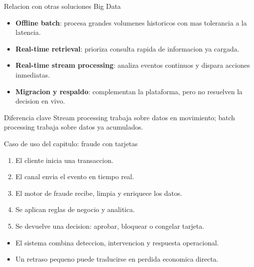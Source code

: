 \documentclass[aspectratio=169]{beamer}
\begin{document}
\begin{frame}{Relacion con otras soluciones Big Data}
  \begin{itemize}
    \item \textbf{Offline batch}: procesa grandes volumenes historicos con mas tolerancia a la latencia.
    \item \textbf{Real-time retrieval}: prioriza consulta rapida de informacion ya cargada.
    \item \textbf{Real-time stream processing}: analiza eventos continuos y dispara acciones inmediatas.
    \item \textbf{Migracion y respaldo}: complementan la plataforma, pero no resuelven la decision en vivo.
  \end{itemize}
  \vspace{0.2cm}
  \begin{block}{Diferencia clave}
    Stream processing trabaja sobre datos en movimiento; batch processing trabaja sobre datos ya acumulados.
  \end{block}
\end{frame}

\begin{frame}{Caso de uso del capitulo: fraude con tarjetas}
  \begin{enumerate}
    \item El cliente inicia una transaccion.
    \item El canal envia el evento en tiempo real.
    \item El motor de fraude recibe, limpia y enriquece los datos.
    \item Se aplican reglas de negocio y analitica.
    \item Se devuelve una decision: aprobar, bloquear o congelar tarjeta.
  \end{enumerate}
  \vspace{0.2cm}
  \begin{itemize}
    \item El sistema combina deteccion, intervencion y respuesta operacional.
    \item Un retraso pequeno puede traducirse en perdida economica directa.
  \end{itemize}
\end{frame}
\end{document}
